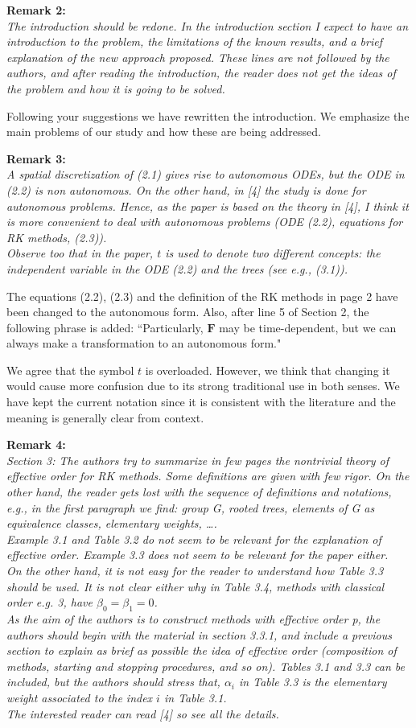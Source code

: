 \documentclass[12pt]{article}
\newcommand{\remark}[2]{\vspace{25pt} \noindent \textbf{Remark #1:\newline} \textit{#2}\vspace{15pt}}
\renewcommand{\newline}{\vspace{15pt}\\}
\begin{document}
\remark{2}{
The introduction should be redone. 
In the introduction section I expect to have an introduction to the problem, the 
limitations of the known results, and a brief explanation of the new approach proposed. 
These lines are not followed by the authors, and after reading the introduction, the 
reader does not get the ideas of the problem and how it is going to be solved.}

Following your suggestions we have rewritten the introduction. 
We emphasize the main problems of our study and how these are being addressed.

\remark{3}{
A spatial discretization of (2.1) gives rise to autonomous ODEs, but the ODE in (2.2) is
non autonomous. 
On the other hand, in [4] the study is done for autonomous problems.
Hence, as the paper is based on the theory in [4], I think it is more convenient to deal
with autonomous problems (ODE (2.2), equations for RK methods, (2.3)).
\newline
Observe too that in the paper, $t$ is used to denote two different concepts: the independent
variable in the ODE (2.2) and the trees (see e.g., (3.1)).}

The equations (2.2), (2.3) and the definition of the RK methods in page 2 have been
changed to the autonomous form. 
Also, after line 5 of Section 2, the following phrase is added:
``Particularly, $\bm{F}$ may be time-dependent, but we can always make a transformation 
to an autonomous form."

We agree that the symbol $t$ is overloaded.  However, we think that changing it would cause more
confusion due to its strong traditional use in both senses.  We have kept the current notation since
it is consistent with the literature and the meaning is generally clear from context.

\remark{4}{
Section 3: The authors try to summarize in few pages the nontrivial theory of effective
order for RK methods. 
Some definitions are given with few rigor. 
On the other hand, the reader gets lost with the sequence of definitions and notations, 
e.g., in the first paragraph we find: group G, rooted trees, elements of G as equivalence 
classes, elementary weights, \dots.
\newline
Example 3.1 and Table 3.2 do not seem to be relevant for the explanation of effective
order. 
Example 3.3 does not seem to be relevant for the paper either.
\newline
On the other hand, it is not easy for the reader to understand how Table 3.3 should be
used. It is not clear either why in Table 3.4, methods with classical order e.g. 3, have
$\beta_0 = \beta_1 = 0$. \\
As the aim of the authors is to construct methods with effective order p, the authors
should begin with the material in section 3.3.1, and include a previous section to explain
as brief as possible the idea of effective order (composition of methods, starting and
stopping procedures, and so on).
Tables 3.1 and 3.3 can be included, but the authors should stress that, $\alpha_i$ in 
Table 3.3 is the elementary weight associated to the index $i$ in Table 3.1.
\newline
The interested reader can read [4] so see all the details.}
\end{document}
